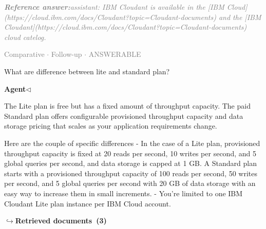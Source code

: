 \documentclass[a4paper,11pt]{article}
\begin{document}
\begin{refanswerenv}
{\footnotesize\textit{\textcolor{gray}{\textbf{Reference answer:}\enspace assistant: IBM Cloudant is available in the [IBM Cloud](https://cloud.ibm.com/docs/Cloudant?topic=Cloudant-documents) and the [IBM Cloudant](https://cloud.ibm.com/docs/Cloudant?topic=Cloudant-documents) cloud catelog.}}}
\end{refanswerenv}
\vspace{0.5em}
\hfill{\tiny\textcolor{gray}{Comparative $\cdot$ Follow-up $\cdot$ ANSWERABLE}}
\begin{userbubble}
What are difference between lite and standard plan?
\end{userbubble}
\noindent\hfill{\small\textcolor{agentcolor}{\textbf{Agent\enspace$\triangleleft$}}}
\begin{agentbubble}
The Lite plan is free but has a fixed amount of throughput capacity. The paid Standard plan offers configurable provisioned throughput capacity and data storage pricing that scales as your application requirements change.  

Here are the couple of specific differences
- In the case of a Lite plan,  provisioned throughput capacity is fixed at 20 reads per second, 10 writes per second, and 5 global queries per second, and data storage is capped at 1 GB. A Standard plan starts with a provisioned throughput capacity of 100 reads per second, 50 writes per second, and 5 global queries per second with 20 GB of data storage with an easy way to increase them in small increments.  
- You're limited to one IBM Cloudant Lite plan instance per IBM Cloud account.
\end{agentbubble}
\noindent\hfill{\footnotesize\textcolor{doccolor}{\textbf{$\hookrightarrow$\enspace Retrieved documents~(3)}}}
\end{document}
